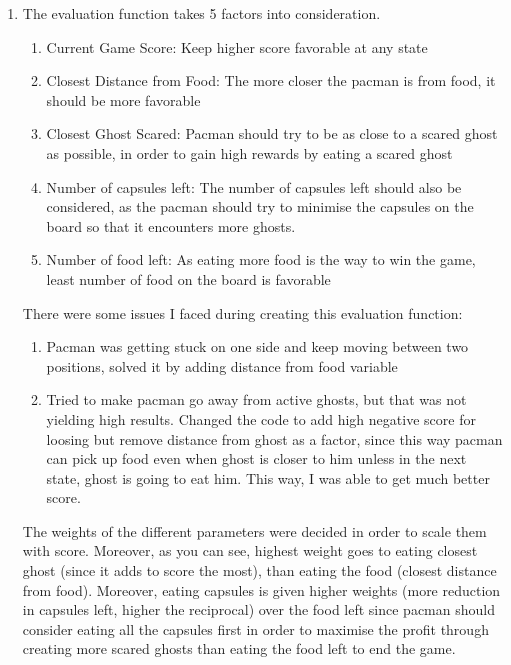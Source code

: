 \documentclass[12pt]{article}
\begin{document}
\begin{enumerate}[label=(\alph*)]
\addtocounter{enumi}{1}
\item The evaluation function takes 5 factors into consideration.
\begin{enumerate}
\item Current Game Score: Keep higher score favorable at any state
\item Closest Distance from Food: The more closer the pacman is from food, it should be more favorable
\item Closest Ghost Scared: Pacman should try to be as close to a scared ghost as possible, in order to gain high rewards by eating a scared ghost
\item Number of capsules left: The number of capsules left should also be considered, as the pacman should try to minimise the capsules on the board so that it encounters more ghosts.
\item Number of food left: As eating more food is the way to win the game, least number of food on the board is favorable
\end{enumerate}
There were some issues I faced during creating this evaluation function:
\begin{enumerate}
\item Pacman was getting stuck on one side and keep moving between two positions, solved it by adding distance from food variable
\item Tried to make pacman go away from active ghosts, but that was not yielding high results. Changed the code to add high negative score for loosing but remove distance from ghost as a factor, since this way pacman can pick up food even when ghost is closer to him unless in the next state, ghost is going to eat him. This way, I was able to get much better score. \\
\end{enumerate}
The weights of the different parameters were decided in order to scale them with score. Moreover, as you can see, highest weight goes to eating closest ghost (since it adds to score the most), than eating the food (closest distance from food). Moreover, eating capsules is given higher weights (more reduction in capsules left, higher the reciprocal) over the food left since pacman should consider eating all the capsules first in order to maximise the profit through creating more scared ghosts than eating the food left to end the game.
\end{enumerate}
\end{document}
